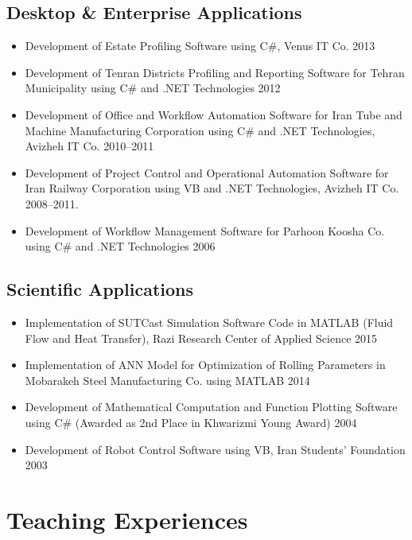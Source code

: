\documentclass{cv}
\begin{document}
\subsection{Desktop \& Enterprise Applications}

\begin{itemize}

\item
Development of Estate Profiling Software using C\#, Venus IT Co. \hfill 2013
\item
Development of Tenran Districts Profiling and Reporting Software for Tehran Municipality using C\# and .NET Technologies \hfill 2012
\item
Development of Office and Workflow Automation Software for Iran Tube and Machine Manufacturing Corporation using C\# and .NET Technologies, Avizheh IT Co. \hfill 2010--2011
\item
Development of Project Control and Operational Automation Software for Iran Railway Corporation using VB and .NET Technologies, Avizheh IT Co. \hfill 2008--2011.
\item
Development of Workflow Management Software for Parhoon Koosha Co. using C\# and .NET Technologies \hfill 2006

\end{itemize}


\subsection{Scientific Applications}

\begin{itemize}
\item
Implementation of SUTCast Simulation Software Code in MATLAB (Fluid Flow and Heat Transfer), Razi Research Center of Applied Science \hfill 2015
\item
Implementation of ANN Model for Optimization of Rolling Parameters in Mobarakeh Steel Manufacturing Co. using MATLAB \hfill 2014
\item
Development of Mathematical Computation and Function Plotting Software using C\# (Awarded as 2nd Place in Khwarizmi Young Award) \hfill 2004
\item
Development of Robot Control Software using VB, Iran Students' Foundation \hfill 2003

\end{itemize}



\section{Teaching Experiences}
\end{document}
